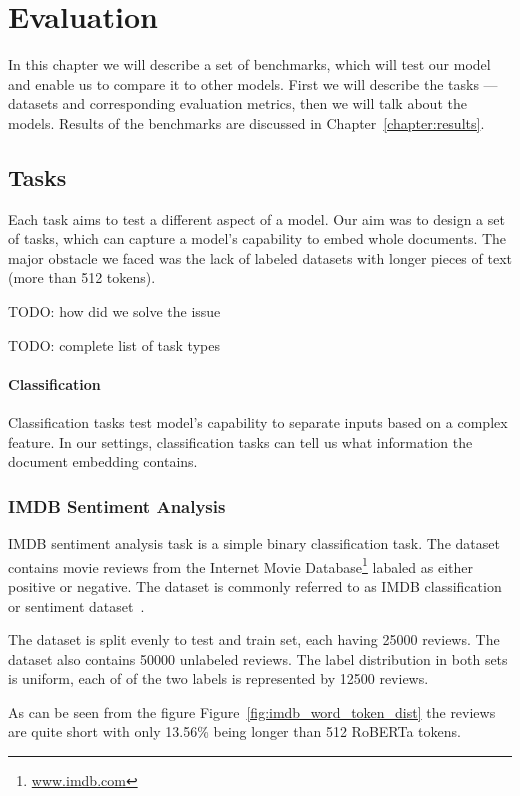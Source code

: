 \chapter{Evaluation}

In this chapter we will describe a set of benchmarks, which will test our model
and enable us to compare it to other models. First we will describe the tasks
--- datasets and corresponding evaluation metrics, then we will talk about the
models. Results of the benchmarks are discussed in
Chapter~\ref{chapter:results}.

\section{Tasks}

Each task aims to test a different aspect of a model. Our aim was to design a
set of tasks, which can capture a model's capability to embed whole documents.
The major obstacle we faced was the lack of labeled datasets with longer pieces
of text (more than 512 tokens).

TODO: how did we solve the issue

TODO: complete list of task types

\subsubsection{Classification}

Classification tasks test model's capability to separate inputs based on a
complex feature. In our settings, classification tasks can tell us what
information the document embedding contains.


\subsection{IMDB Sentiment Analysis}

IMDB sentiment analysis task is a simple binary classification task. The dataset
contains movie reviews from the Internet Movie
Database\footnote{\url{www.imdb.com}} labaled as either positive or negative.
The dataset is commonly referred to as IMDB classification or sentiment
dataset~\cite{maas11}.

The dataset is split evenly to test and train set, each having 25000 reviews.
The dataset also contains 50000 unlabeled reviews. The label distribution in
both sets is uniform, each of of the two labels is represented by 12500 reviews.

As can be seen from the figure Figure~\ref{fig:imdb_word_token_dist} the reviews
are quite short with only 13.56\% being longer than 512 RoBERTa tokens.

